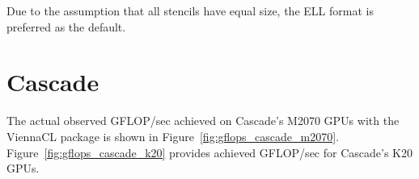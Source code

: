 \documentclass{report}
\begin{document}
%




Due to the assumption that all stencils have equal size, the ELL format is preferred as the default. 
 

\section{Cascade}

The actual observed GFLOP/sec achieved on Cascade's M2070 GPUs with the ViennaCL package is shown in Figure~\ref{fig:gflops_cascade_m2070}. Figure~\ref{fig:gflops_cascade_k20} provides achieved GFLOP/sec for Cascade's K20 GPUs.  
\end{document}
